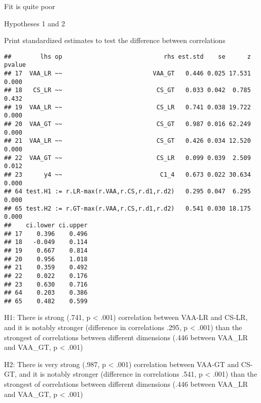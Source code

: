\documentclass[
]{article}
\newenvironment{Shaded}{\begin{snugshade}}{\end{snugshade}}
\newcommand{\KeywordTok}[1]{\textcolor[rgb]{0.13,0.29,0.53}{\textbf{#1}}}
\newcommand{\NormalTok}[1]{#1}
\newcommand{\OperatorTok}[1]{\textcolor[rgb]{0.81,0.36,0.00}{\textbf{#1}}}
\newcommand{\StringTok}[1]{\textcolor[rgb]{0.31,0.60,0.02}{#1}}
\begin{document}
Fit is quite poor

Hypotheses 1 and 2

Print standardized estimates to test the difference between correlations

\begin{Shaded}
\end{Shaded}

\begin{verbatim}
##        lhs op                            rhs est.std    se      z pvalue
## 17  VAA_LR ~~                         VAA_GT   0.446 0.025 17.531  0.000
## 18   CS_LR ~~                          CS_GT   0.033 0.042  0.785  0.432
## 19  VAA_LR ~~                          CS_LR   0.741 0.038 19.722  0.000
## 20  VAA_GT ~~                          CS_GT   0.987 0.016 62.249  0.000
## 21  VAA_LR ~~                          CS_GT   0.426 0.034 12.520  0.000
## 22  VAA_GT ~~                          CS_LR   0.099 0.039  2.509  0.012
## 23      y4 ~~                           C1_4   0.673 0.022 30.634  0.000
## 64 test.H1 := r.LR-max(r.VAA,r.CS,r.d1,r.d2)   0.295 0.047  6.295  0.000
## 65 test.H2 := r.GT-max(r.VAA,r.CS,r.d1,r.d2)   0.541 0.030 18.175  0.000
##    ci.lower ci.upper
## 17    0.396    0.496
## 18   -0.049    0.114
## 19    0.667    0.814
## 20    0.956    1.018
## 21    0.359    0.492
## 22    0.022    0.176
## 23    0.630    0.716
## 64    0.203    0.386
## 65    0.482    0.599
\end{verbatim}

H1: There is strong (.741, p \textless{} .001) correlation between
VAA-LR and CS-LR, and it is notably stronger (difference in correlations
.295, p \textless{} .001) than the strongest of correlations between
different dimensions (.446 between VAA\_LR and VAA\_GT, p \textless{}
.001)

H2: There is very strong (.987, p \textless{} .001) correlation between
VAA-GT and CS-GT, and it is notably stronger (difference in correlations
.541, p \textless{} .001) than the strongest of correlations between
different dimensions (.446 between VAA\_LR and VAA\_GT, p \textless{}
.001)
\end{document}
